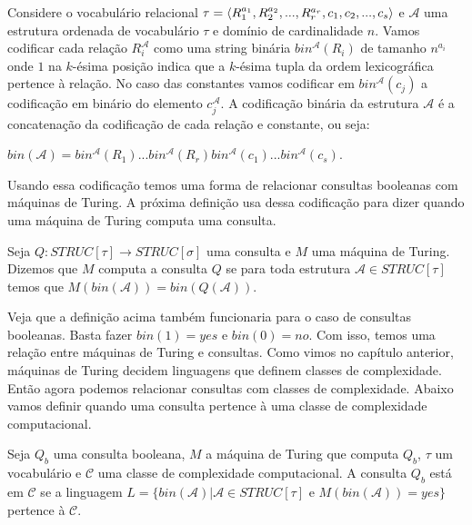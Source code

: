 \begin{defi}
Considere o vocabulário relacional $\tau = \left \langle R_{1}^{a_1}, R_{2}^{a_2}, ..., R_{r}^{a_r}, c_1, c_2, ..., c_s \right \rangle $ e $\mathcal{A}$ uma estrutura ordenada de vocabulário $\tau$ e domínio de cardinalidade $n$. Vamos codificar cada relação $R_i^{\mathcal{A}}$ como uma string binária $bin^{\mathcal{A}}(R_i)$ de tamanho $n^{a_i}$ onde $1$ na $k$-ésima posição indica que a $k$-ésima tupla da ordem lexicográfica pertence à relação. No caso das constantes vamos codificar em $bin^{\mathcal{A}}(c_j)$ a codificação em binário do elemento $c^{\mathcal{A}}_j$. A codificação binária da estrutura $\mathcal{A}$ é a concatenação da codificação de cada relação e constante, ou seja:
\begin{center}
$bin(\mathcal{A}) = bin^{\mathcal{A}}(R_1)...bin^{\mathcal{A}}(R_r)bin^{\mathcal{A}}(c_1)...bin^{\mathcal{A}}(c_s)$.
\end{center} 
\end{defi}

Usando essa codificação temos uma forma de relacionar consultas booleanas com máquinas de Turing. A próxima definição usa dessa codificação para dizer quando uma máquina de Turing computa uma consulta.

\begin{defi}
Seja $Q : STRUC[\tau] \to STRUC[\sigma]$ uma consulta e $M$ uma máquina de Turing. Dizemos que $M$ computa a consulta $Q$ se para toda estrutura $\mathcal{A} \in STRUC[\tau]$ temos que $M(bin(\mathcal{A})) = bin(Q(\mathcal{A}))$.
\end{defi}

Veja que a definição acima também funcionaria para o caso de consultas booleanas. Basta fazer $bin(1) = yes$ e $bin(0) = no$. Com isso, temos uma relação entre máquinas de Turing e consultas. Como vimos no capítulo anterior, máquinas de Turing decidem linguagens que definem classes de complexidade. Então agora podemos relacionar consultas com classes de complexidade.
Abaixo vamos definir quando uma consulta pertence à uma classe de complexidade computacional.

\begin{defi}
Seja $Q_b$ uma consulta booleana, $M$ a máquina de Turing que computa $Q_b$, $\tau$ um vocabulário e $\mathcal{C}$ uma classe de complexidade computacional. A consulta $Q_b$ está em $\mathcal{C}$ se a linguagem $L = \{ bin(\mathcal{A}) | \mathcal{A} \in STRUC[\tau]$ e $M(bin(\mathcal{A})) = yes\}$ pertence à $\mathcal{C}$.
\end{defi}

